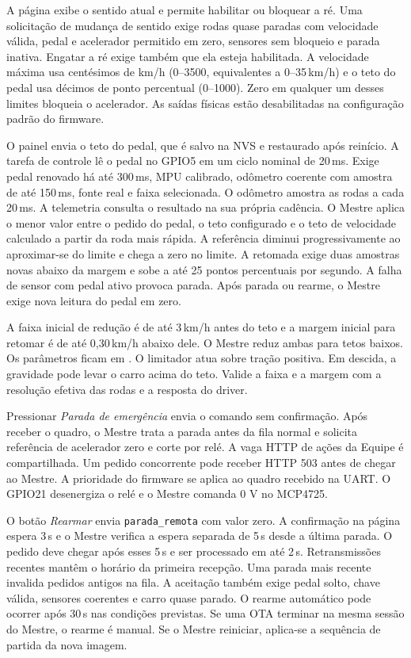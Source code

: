 A página exibe o sentido atual e permite habilitar ou bloquear a ré. Uma solicitação de mudança de sentido exige rodas quase paradas com velocidade válida, pedal e acelerador permitido em zero, sensores sem bloqueio e parada inativa. Engatar a ré exige também que ela esteja habilitada. A velocidade máxima usa centésimos de km/h (0--3500, equivalentes a 0--35\,km/h) e o teto do pedal usa décimos de ponto percentual (0--1000). Zero em qualquer um desses limites bloqueia o acelerador. As saídas físicas estão desabilitadas na configuração padrão do firmware.

O painel envia o teto do pedal, que é salvo na NVS e restaurado após reinício. A tarefa de controle lê o pedal no GPIO5 em um ciclo nominal de 20\,ms. Exige pedal renovado há até 300\,ms, MPU calibrado, odômetro coerente com amostra de até 150\,ms, fonte real e faixa selecionada. O odômetro amostra as rodas a cada 20\,ms. A telemetria consulta o resultado na sua própria cadência. O Mestre aplica o menor valor entre o pedido do pedal, o teto configurado e o teto de velocidade calculado a partir da roda mais rápida. A referência diminui progressivamente ao aproximar-se do limite e chega a zero no limite. A retomada exige duas amostras novas abaixo da margem e sobe a até 25 pontos percentuais por segundo. A falha de sensor com pedal ativo provoca parada. Após parada ou rearme, o Mestre exige nova leitura do pedal em zero.

A faixa inicial de redução é de até 3\,km/h antes do teto e a margem inicial para retomar é de até 0,30\,km/h abaixo dele. O Mestre reduz ambas para tetos baixos. Os parâmetros ficam em . O limitador atua sobre tração positiva. Em descida, a gravidade pode levar o carro acima do teto. Valide a faixa e a margem com a resolução efetiva das rodas e a resposta do driver.

Pressionar \emph{Parada de emergência} envia o comando sem confirmação. Após receber o quadro, o Mestre trata a parada antes da fila normal e solicita referência de acelerador zero e corte por relé. A vaga HTTP de ações da Equipe é compartilhada. Um pedido concorrente pode receber HTTP 503 antes de chegar ao Mestre. A prioridade do firmware se aplica ao quadro recebido na UART. O GPIO21 desenergiza o relé e o Mestre comanda 0 V no MCP4725.

O botão \emph{Rearmar} envia \texttt{parada\_remota} com valor zero. A confirmação na página espera 3\,s e o Mestre verifica a espera separada de 5\,s desde a última parada. O pedido deve chegar após esses 5\,s e ser processado em até 2\,s. Retransmissões recentes mantêm o horário da primeira recepção. Uma parada mais recente invalida pedidos antigos na fila. A aceitação também exige pedal solto, chave válida, sensores coerentes e carro quase parado. O rearme automático pode ocorrer após 30\,s nas condições previstas. Se uma OTA terminar na mesma sessão do Mestre, o rearme é manual. Se o Mestre reiniciar, aplica-se a sequência de partida da nova imagem.

